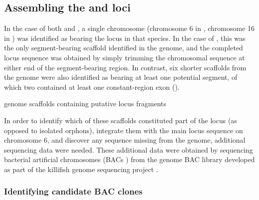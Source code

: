 \subsection{Assembling the \Nfu and \Xma \igh{} loci}
\label{sec:locus_assembly_methods}

In the case of both \nfu and \xma, a single chromosome (chromosome 6 in \Nfu, chromosome 16 in \Xma) was identified as bearing the \igh{} locus in that species. In the case of \Xma, this was the only segment-bearing scaffold identified in the genome, and the completed locus sequence was obtained by simply trimming the chromosomal sequence at either end of the segment-bearing region. In contrast, six shorter scaffolds from the \Nfu genome were also identified as bearing at least one potential \igh segment, of which two contained at least one constant-region exon (). 

\begin{table}
\centering
\caption{\Nfu genome scaffolds containing putative \igh{} locus fragments}
\begin{threeparttable}

\end{threeparttable}
\label{tab:nfu-locus-scaffolds}
\end{table}

In order to identify which of these scaffolds constituted part of the \Nfu \igh{} locus (as opposed to isolated orphons), integrate them with the main locus sequence on chromosome 6, and discover any sequence missing from the genome, additional sequencing data were needed. These additional data were obtained by sequencing bacterial artificial chromosomes (BACs \parencite{luo2001bac,saski2015bacprotocol}) from the \Nfu genome BAC library developed as part of the killifish genome sequencing project \parencite{reichwald2015genome}.

\subsubsection{Identifying candidate BAC clones}
\label{sec:bac-methods-ident}

